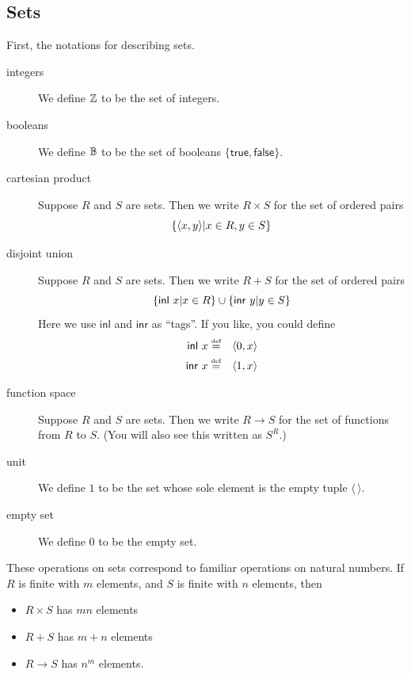 \documentclass[runningheads,12pt]{llncs}
\begin{document}
\subsection{Sets}

First, the notations for describing sets.  
\begin{description}
\item[integers] We define $\mathbb{Z}$ to be the set of integers.
\item[booleans] We define $\mathbb{B}$ to be the set of booleans $\{\mathsf{true},\mathsf{false}\}$.
\item[cartesian product]  Suppose $R$ and $S$ are sets.  Then we write $R \times S$ for the set of ordered pairs 
  \begin{displaymath}
\{\langle {{x},{y}} \rangle | x \in R, y \in S \}
\end{displaymath}  
\item[disjoint union] Suppose $R$ and $S$ are sets.  Then we write $R + S$ for the set of ordered pairs
  \begin{displaymath}
\{ \mathsf{inl} \  {x} | x \in  R \}  \cup \{ \mathsf{inr} \  {y} | y \in S \}
\end{displaymath}
Here we use $\mathsf{inl}$ and $\mathsf{inr}$ as ``tags''.  If you like, you could define
\begin{eqnarray*}
  \mathsf{inl} \  {x} & \stackrel{\mbox{\rm {\tiny def}}}{=} & \langle {{0},{x}} \rangle \\
  \mathsf{inr} \  {x} & \stackrel{\mbox{\rm {\tiny def}}}{=} & \langle {{1},{x}} \rangle
\end{eqnarray*}
\item[function space] Suppose $R$ and $S$ are sets.   Then we write $R \rightarrow S$ for the set of functions from $R$ to $S$.  (You will also see this written as $S^R$.)
\item[unit] We define $1$ to be the set whose sole element is the empty tuple $\langle\,\rangle$.
\item[empty set] We define $0$ to be the empty set.
\end{description}
These operations on sets correspond to familiar operations on natural numbers.  If $R$ is finite with $m$ elements, and $S$ is finite with $n$ elements, then
\begin{itemize}
\item $R \times S$ has $mn$ elements
\item $R + S$ has $m+n$ elements
\item $R \rightarrow S$ has $n^{m}$ elements.
\end{itemize}
\end{document}

